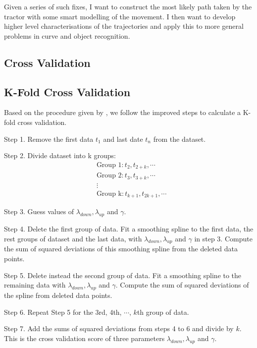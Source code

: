Given a series of such fixes, I want to construct the most likely path taken by the tractor with some smart modelling of the movement. I then want to develop higher level characterisations of the trajectories and apply this to more general problems in curve and object recognition.



\subsection{Cross Validation}

\subsection{K-Fold Cross Validation}

Based on the procedure given by \cite{wahba1975completely}, we  follow the improved steps to calculate a K-fold cross validation. 

Step 1. Remove the first data $t_1$ and last date $t_n$ from the dataset.

Step 2. Divide dataset into k groups:
\begin{align*}
& \mbox{Group 1}: t_2, t_{2+k}, \cdots \\
& \mbox{Group 2}: t_3, t_{3+k}, \cdots \\
& \vdots \\
& \mbox{Group k}: t_{k+1}, t_{2k+1}, \cdots
\end{align*}


Step 3. Guess values of $\lambda_{down}, \lambda_{up}$ and $\gamma$.

Step 4. Delete the first group of data. Fit a smoothing spline to the first data, the rest groups of dataset and the last data, with  $\lambda_{down}, \lambda_{up}$ and $\gamma$ in step 3. Compute the sum of squared deviations of this smoothing spline from the deleted data points.

Step 5. Delete instead the second group of data. Fit a smoothing spline to the remaining data with  $\lambda_{down}, \lambda_{up}$ and $\gamma$. Compute the sum of squared deviations of the spline from deleted data points.

Step 6. Repeat Step 5 for the 3rd, 4th, $\cdots$, $k$th group of data.

Step 7. Add the sums of squared deviations from steps 4 to 6 and divide by $k$. This is the cross validation score of three parameters  $\lambda_{down}, \lambda_{up}$ and $\gamma$.

